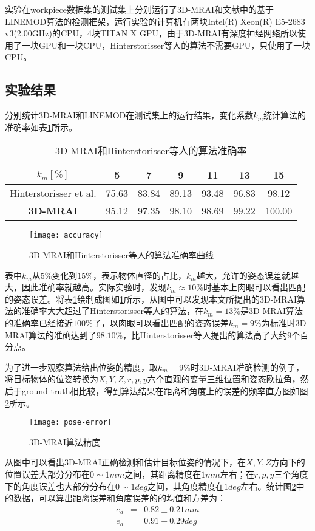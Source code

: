 实验在workpiece数据集的测试集上分别运行了3D-MRAI和文献\cite{hinterstoisser2012model}中的基于LINEMOD算法的检测框架，运行实验的计算机有两块Intel(R) Xeon(R) E5-2683 v3(2.00GHz)的CPU，4块TITAN X GPU，由于3D-MRAI有深度神经网络所以使用了一块GPU和一块CPU，Hinterstorisser等人的算法不需要GPU，只使用了一块CPU。

\subsection{实验结果}
分别统计3D-MRAI和LINEMOD在测试集上的运行结果，变化系数$k_m$统计算法的准确率如表\ref{tab:mrai}所示。
\begin{table}[ht]
  \centering
  \begin{tabular}{ccccccc}
    \toprule
    $k_m[\%]$&5&7&9&11&13&15\\
    \midrule
    Hinterstorisser et al.&75.63& 83.84& 89.13& 93.48& 96.83&98.12\\
    \bf{3D-MRAI}&95.12& 97.35& 98.10& 98.69& 99.22& 100.00\\
    \bottomrule
  \end{tabular}
  \caption{3D-MRAI和Hinterstorisser等人的算法准确率}
  \label{tab:mrai}
\end{table}
\begin{figure}[ht]
  \centering
  \texttt{[image: accuracy]}
  \caption{3D-MRAI和Hinterstorisser等人的算法准确率曲线}
  \label{fig:mrai}
\end{figure}
表中$k_m$从$5\%$变化到$15\%$，表示物体直径的占比，$k_m$越大，允许的姿态误差就越大，因此准确率就越高。实际实验时，发现$k_m\approx 10\%$时基本上肉眼可以看出匹配的姿态误差。将表\ref{tab:mrai}绘制成图如\ref{fig:mrai}所示，从图中可以发现本文所提出的3D-MRAI算法的准确率大大超过了Hinterstorisser等人的算法，在$k_m=13\%$是3D-MRAI算法的准确率已经接近$100\%$了，以肉眼可以看出匹配的姿态误差$k_m=9\%$为标准时3D-MRAI算法的准确达到了$98.10\%$，比Hinterstorisser等人提出的算法高了大约$9$个百分点。

为了进一步观察算法给出位姿的精度，取$k_m=9\%$时3D-MRAI准确检测的例子，将目标物体的位姿转换为$X,Y,Z,r,p,y$六个直观的变量三维位置和姿态欧拉角，然后于ground truth相比较，得到算法结果在距离和角度上的误差的频率直方图如图\ref{fig:pose-error}所示。
\begin{figure}[ht]
  \centering
  \texttt{[image: pose-error]}
  \caption{3D-MRAI算法精度}
  \label{fig:pose-error}
\end{figure}
从图中可以看出3D-MRAI正确检测和估计目标位姿的情况下，在$X,Y,Z$方向下的位置误差大部分分布在$0\sim 1mm$之间，其距离精度在$1mm$左右；在$r,p,y$三个角度下的角度误差也大部分分布在$0\sim 1deg$之间，其角度精度在$1deg$左右。统计图\ref{fig:pose-error}中的数据，可以算出距离误差和角度误差的的均值和方差为：
\begin{equation}
  \begin{array}{ccc}
    e_d &=& 0.82\pm0.21mm\\
    e_a &=& 0.91\pm0.29deg
  \end{array}
\end{equation}

